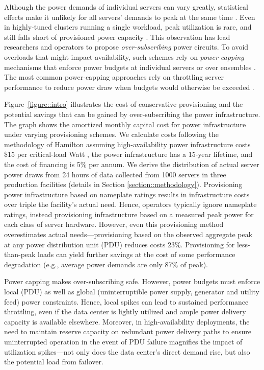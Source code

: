 Although the power demands of individual servers can vary greatly, statistical effects make it unlikely for all servers' demands to peak at the same time \cite{Govindan09,Ranganathan06}. Even in highly-tuned clusters running a single workload, peak utilization is rare, and still falls short of provisioned power capacity \cite{Fan07}.  This observation has lead researchers and operators to propose \emph{over-subscribing} power circuits.  To avoid overloads that might impact availability, such schemes rely on \emph{power capping} mechanisms that enforce power budgets at individual servers \cite{Lefurgy08, Wang08} or over ensembles \cite{Ranganathan06, Wang09}.  The most common power-capping approaches rely on throttling server performance to reduce power draw when budgets would otherwise be exceeded \cite{Lefurgy08,Ranganathan06, Wang08,Wang09}.  

Figure~\ref{figure::intro} illustrates the cost of conservative provisioning and the potential savings that can be gained by over-subscribing the power infrastructure.  The graph shows the amortized monthly capital cost for power infrastructure under varying provisioning schemes.  We calculate costs following the methodology of Hamilton \cite{Hamilton09} assuming high-availability power infrastructure costs \$15 per critical-load Watt \cite{Turner06}, the power infrastructure has a 15-year lifetime, and the cost of financing is 5\% per annum.   We derive the distribution of actual server power draws from 24 hours of data collected from 1000 servers in three production facilities (details in Section \ref{section::methodology}).  Provisioning power infrastructure based on nameplate ratings results in infrastructure costs over triple the facility's actual need.  Hence, operators typically ignore nameplate ratings, instead provisioning infrastructure based on a measured peak power for each class of server hardware.  However, even this provisioning method overestimates actual needs---provisioning based on the observed aggregate peak at any power distribution unit (PDU) reduces costs 23\%. Provisioning for less-than-peak loads can yield further savings at the cost of some performance degradation (e.g., average power demands are only 87\% of peak).  

Power capping makes over-subscribing safe.  However, power budgets must enforce local (PDU) as well as global (uninterruptible power supply, generator and utility feed) power constraints.  Hence, local spikes can lead to sustained performance throttling, even if the data center is lightly utilized and ample power delivery capacity is available elsewhere.  Moreover, in high-availability deployments, the need to maintain reserve capacity on redundant power delivery paths to ensure uninterrupted operation in the event of PDU failure magnifies the impact of utilization spikes---not only does the data center's direct demand rise, but also the potential load from failover.

